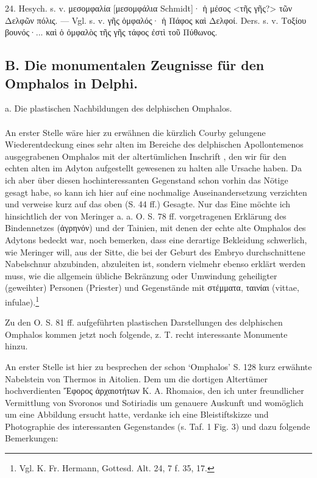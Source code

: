 \documentclass[a4paper, 11pt, oneside]{article}
\newcommand*\svgAAC{}
\begin{document}
24. Hesych. s. v. μεσομφαλία [μεσομφάλια Schmidt]· ἡ μέσος <τῆς γῆς?> τῶν Δελφῶν πόλις. --- Vgl. s. v. γῆς ὀμφαλός· ἡ Πάφος καὶ Δελφοί. Ders. s. v. Τοξίου βουνός·... καὶ ὁ ὀμφαλὸς τῆς γῆς τάφος ἐστὶ τοῦ Πύθωνος.
\subsection{B. Die monumentalen Zeugnisse für den Omphalos in Delphi.}
\begin{center}
a. Die plastischen Nachbildungen des delphischen Omphalos.
\end{center}
\paragraph{}
An erster Stelle wäre hier zu erwähnen die kürzlich Courby gelungene Wiederentdeckung eines sehr alten im Bereiche des delphischen Apollontemenos ausgegrabenen Omphalos mit der altertümlichen Inschrift $\svgAAC$, den wir für den echten alten im Adyton aufgestellt gewesenen zu halten alle Ursache haben. Da ich aber über diesen hochinteressanten Gegenstand schon vorhin das Nötige gesagt habe, so kann ich hier auf eine nochmalige Auseinandersetzung verzichten und verweise kurz auf das oben (S. 44 ff.) Gesagte. Nur das Eine möchte ich hinsichtlich der von Meringer a. a. O. S. 78 ff. vorgetragenen Erklärung des Bindennetzes (ἀγρηνόν) und der Tainien, mit denen der echte alte Omphalos des Adytons bedeckt war, noch bemerken, dass eine derartige Bekleidung schwerlich, wie Meringer will, aus der Sitte, die bei der Geburt des Embryo durchschnittene Nabelschnur abzubinden, abzuleiten ist, sondern vielmehr ebenso erklärt werden muss, wie die allgemein übliche Bekränzung oder Umwindung geheiligter (geweihter) Personen (Priester) und Gegenstände mit στέμματα, ταινίαι (vittae, infulae).\footnote{Vgl. K. Fr. Hermann, Gottesd. Alt. 24, 7 f. 35, 17.}

Zu den O. S. 81 ff. aufgeführten plastischen Darstellungen des delphischen Omphalos kommen jetzt noch folgende, z. T. recht interessante Monumente hinzu.

An erster Stelle ist hier zu besprechen der schon `Omphalos' S. 128 kurz erwähnte Nabelstein von Thermos in Aitolien. Dem um die dortigen Altertümer hochverdienten Ἔφορος ἀρχαιοτήτων K. A. Rhomaios, den ich unter freundlicher Vermittlung von Svoronos und Sotiriadis um genauere Auskunft und womöglich um eine Abbildung ersucht hatte, verdanke ich eine Bleistiftskizze und Photographie des interessanten Gegenstandes (s. Taf. 1 Fig. 3) und dazu folgende Bemerkungen:
\end{document}
